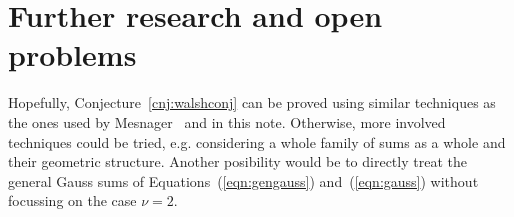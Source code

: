\documentclass[11pt,a4paper]{article}
\makeatletter
\newcommand{\eg}{e.g.\@\xspace}
\makeatother
\begin{document}
\section{Further research and open problems}

Hopefully, Conjecture~\ref{cnj:walshconj} can be proved using
similar techniques
as the ones used by Mesnager~\cite{DBLP:journals/dcc/Mesnager11,DBLP:journals/tit/Mesnager11}
and in this note.
Otherwise, more involved techniques could be tried, \eg considering a whole
family of sums as a whole and their geometric structure.
Another posibility would be to directly treat the general Gauss sums of
Equations~(\ref{eqn:gengauss}) and~(\ref{eqn:gauss}) without focussing
on the case $\nu = 2$.



\end{document}
